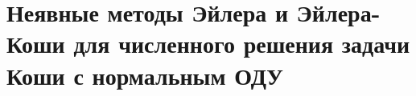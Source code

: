 \documentclass[__main__.tex]{subfiles}
\begin{document}
\section{Неявные методы Эйлера и Эйлера-Коши для численного решения задачи Коши с нормальным ОДУ}
\end{document}
